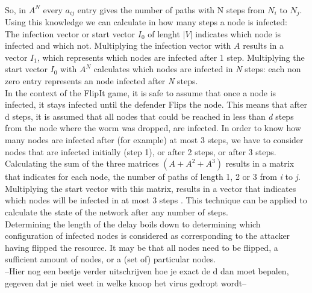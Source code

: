~~\\
So, in $A^{N}$ every $a_{ij}$ entry gives the number of paths with N steps from $N_{i}$ to $N_{j}$.\\

Using this knowledge we can calculate in how many steps a node is infected: \\
The infection vector or start vector $I_{0}$ of lenght $|V|$ indicates which node is infected and which not. Multiplying the infection vector with $A$ results in a vector $I_{1}$, which represents which nodes are infected after 1 step. Multiplying the start vector $I_{0}$ with $A^{N}$ calculates which nodes are infected in \textit{N} steps: each non zero entry represents an node infected after \textit{N} steps. \\
In the context of the FlipIt game, it is safe to assume that once a node is infected, it stays infected until the defender Flips the node. This means that after d steps, it is assumed that all nodes that could be reached in less than \textit{d} steps from the node where the worm was dropped, are infected. In order to know how many nodes are infected after (for example) at most 3 steps, we have to consider nodes that are infected initially (step 1), or after 2 steps, or after 3 steps.  Calculating the sum of the three matrices $(A + A^{2} + A^{3}) $ results in a matrix that indicates for each node, the number of paths of length 1, 2 or 3 from \textit{i} to \textit{ j}. Multiplying the start vector with this matrix, results in a vector that indicates which nodes will be infected in at most 3 steps . This technique can be applied to calculate the state of the network after any number of steps. \\

Determining the length of the delay boils down to determining which configuration of infected nodes is considered as corresponding to the attacker having flipped the resource. It may be that all nodes need to be flipped, a sufficient amount of nodes, or a (set of) particular nodes.\\

--Hier nog een beetje verder uitschrijven hoe je exact de d dan moet bepalen, gegeven dat je niet weet in welke knoop het virus gedropt wordt-- \\


